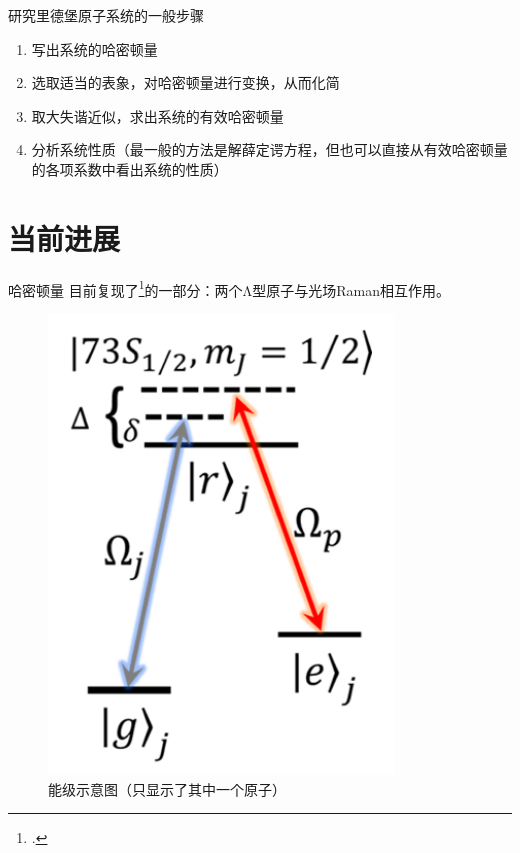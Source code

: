 \documentclass[10pt,aspectratio=43]{beamer}
\begin{document}
\begin{frame}{研究里德堡原子系统的一般步骤}
\begin{enumerate}
\item 写出系统的哈密顿量
\item 选取适当的表象，对哈密顿量进行变换，从而化简
\item 取大失谐近似，求出系统的有效哈密顿量
\item 分析系统性质（最一般的方法是解薛定谔方程，但也可以直接从有效哈密顿量的各项系数中看出系统的性质）
\end{enumerate}
\end{frame}
\section{当前进展}
\begin{frame}{哈密顿量}
目前复现了\footcite{PhysRevA.105.032417}的一部分：两个Λ型原子与光场Raman相互作用。
\begin{figure}
\centering
\includegraphics[height=0.5\textheight]{figures/pra-energy-level}
\caption{能级示意图（只显示了其中一个原子）}
\label{fig:pra-energy-level}
\end{figure}
\end{frame}
\end{document}
